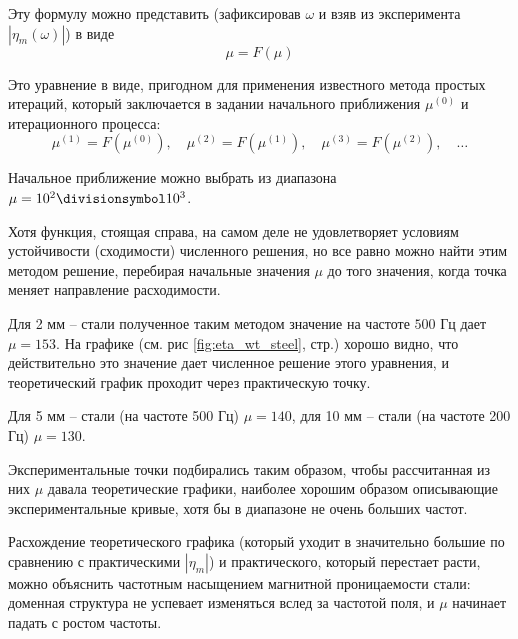 

Эту формулу можно представить (зафиксировав $\omega$ и взяв из эксперимента $|\eta_m(\omega)|$) в виде
\begin{equation}
	\mu=F(\mu)
\end{equation}

Это уравнение в виде, пригодном для применения известного метода простых итераций, который заключается в задании начального приближения $\mu^{(0)}$ и итерационного процесса:
\begin{equation}
	\mu^{(1)}=F(\mu^{(0)}),\quad
	\mu^{(2)}=F(\mu^{(1)}),\quad
	\mu^{(3)}=F(\mu^{(2)}),\quad\ldots
\end{equation}

Начальное приближение можно выбрать из диапазона $\mu=10^2 \divisionsymbol 10^3$.

Хотя функция, стоящая справа, на самом деле не удовлетворяет условиям устойчивости (сходимости) численного решения, но все равно можно найти этим методом решение, перебирая начальные значения $\mu$ до того значения, когда точка меняет направление расходимости. 

Для 2 мм -- стали полученное таким методом значение на частоте $500$ Гц дает $\mu=153$. На графике (см. рис \ref{fig:eta_wt_steel}, стр.\pageref{fig:eta_wt_steel}) хорошо видно, что действительно это значение дает численное решение этого уравнения, и теоретический график проходит через практическую точку.

Для 5 мм -- стали (на частоте 500 Гц) $\mu=140$, для 10 мм -- стали (на частоте 200 Гц) $\mu=130$.

Экспериментальные точки подбирались таким образом, чтобы рассчитанная из них $\mu$ давала теоретические графики, наиболее хорошим образом описывающие экспериментальные кривые, хотя бы в диапазоне не очень больших частот.


Расхождение теоретического графика (который уходит в значительно большие по сравнению с практическими $|\eta_m|$)  и практического, который перестает расти, можно объяснить частотным насыщением магнитной проницаемости стали: доменная структура не успевает изменяться вслед за частотой поля, и $\mu$ начинает падать с ростом частоты.

